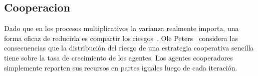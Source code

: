 \documentclass[a4paper,10pt]{article}
\begin{document}
% 

\subsection{Cooperacion}

Dado que en los procesos multiplicativos la varianza realmente importa, una forma eficaz de reducirla es compartir los riesgos~\cite{yaari2010-cooperationEvolution, peters-cooperation2019.03.04}.
Ole Peters~\cite{peters-cooperation2019.03.04} considera las consecuencias que la distribución del riesgo de una estrategia cooperativa sencilla tiene sobre la tasa de crecimiento de los agentes.
Los agentes cooperadores simplemente reparten sus recursos en partes iguales luego de cada iteración.
\end{document}
